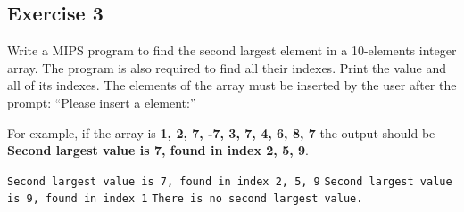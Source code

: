 \subsection{Exercise 3}
Write a MIPS program to find the second largest element in a 10-elements
integer array. The program is also required to find all their indexes. Print
the value and all of its indexes. The elements of the array must be inserted
by the user after the prompt: ``Please insert a element:''

For example, if the array is \textbf{1, 2, 7, -7, 3, 7, 4, 6, 8, 7} the output
should be \textbf{Second largest value is 7, found in index 2, 5, 9}.

%
  {\texttt{Second largest value is 7, found in index 2, 5, 9}}
%
  {\texttt{Second largest value is 9, found in index 1}}
%
  {\texttt{There is no second largest value.}}
